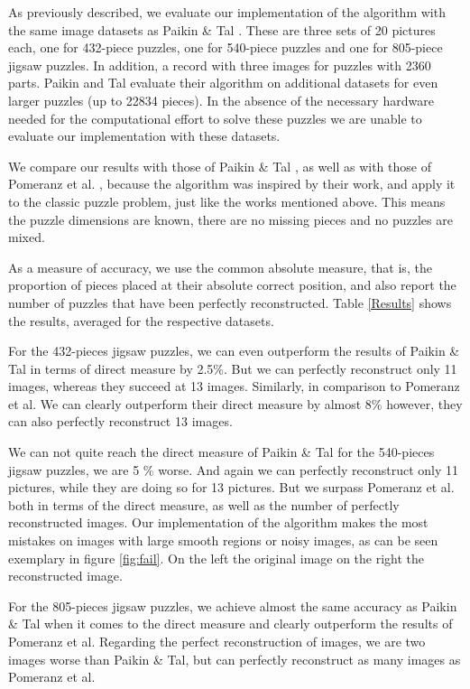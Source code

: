 \documentclass[11pt]{report}
\begin{document}
As previously described, we evaluate our implementation of the algorithm with
the same image datasets as Paikin \& Tal \cite{Paikin2015}. These are three sets
of 20 pictures each, one for 432-piece puzzles, one for 540-piece puzzles and
one for 805-piece jigsaw puzzles. In addition, a record with three images for
puzzles with 2360 parts. Paikin and Tal evaluate their algorithm on additional
datasets for even larger puzzles (up to 22834 pieces). In the absence of the
necessary hardware needed for the computational effort to solve these puzzles we
are unable to evaluate our implementation with these datasets.

We compare our
results with those of Paikin \& Tal \cite{Paikin2015}, as well as with those of
Pomeranz et al. \cite{Pomeranz2011}, because the algorithm was inspired by their
work, and apply it to the classic puzzle problem, just like the works mentioned
above. This means the puzzle dimensions are known, there are no missing pieces
and no puzzles are mixed.

As a measure of accuracy, we use the common absolute measure, that is, the
proportion of pieces placed at their absolute correct position, and also report
the number of puzzles that have been perfectly reconstructed. Table
\ref{Results} shows the results, averaged for the respective datasets.

For the 432-pieces jigsaw puzzles, we can even outperform the results of Paikin \& Tal in
terms of direct measure by 2.5\%. But we can perfectly reconstruct only 11 images,
whereas they succeed at 13 images. Similarly, in comparison to Pomeranz et
al. We can clearly outperform their direct measure by almost 8\% however, they
can also perfectly reconstruct 13 images.

We can not quite reach the direct measure of Paikin \& Tal for the 540-pieces
jigsaw puzzles, we are 5 \% worse. And again we can perfectly reconstruct only 11
pictures, while they are doing so for 13 pictures. But we surpass Pomeranz et
al. both in terms of the direct measure, as well as the number of perfectly
reconstructed images. Our implementation of the algorithm makes the most
mistakes on images with large smooth regions or noisy images, as can be seen
exemplary in figure \ref{fig:fail}. On the left the original image on the right
the reconstructed image.

For the 805-pieces jigsaw puzzles, we achieve almost the same accuracy as Paikin
\& Tal when it comes to the direct measure and clearly outperform the results
of Pomeranz et al. Regarding the perfect reconstruction of images, we are two
images worse than Paikin \& Tal, but can perfectly reconstruct as many images as
Pomeranz et al.
\end{document}
